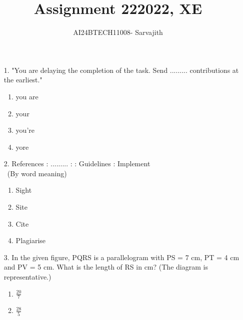 \documentclass[journal]{IEEEtran}
\begin{document}

\vspace{3cm}


\author{AI24BTECH11008- Sarvajith
}
\title{Assignment 22}
{\let\newpage\relax\maketitle}
\title{2022, XE}
\renewcommand{\thefigure}{\theenumi}
\renewcommand{\thetable}{\theenumi}
\setlength{\intextsep}{10pt} %
\renewcommand{\thetable}{\theenumi}
\begin{enumerate}
    \item[1.] "You are delaying the completion of the task. Send ......... contributions at the
    earliest."
    \begin{enumerate}[label = (\Alph*)]
        \item you are
        \item your
        \item you're 
        \item yore
    \end{enumerate}
    \item[2.] References : ......... : : Guidelines : Implement\\\
    (By word meaning)
    \begin{enumerate}[label = (\Alph*)]
        \item Sight
        \item Site
        \item Cite 
        \item Plagiarise 
    \end{enumerate}
    \item[3.] In the given figure, PQRS is a parallelogram with PS = 7 cm, PT = 4 cm and
    PV = 5 cm. What is the length of RS in cm? (The diagram is representative.) 
    \begin{figure}[!ht]
        \centering
        \caption{}
    \end{figure}
    \begin{enumerate}[label = (\Alph*)]
        \item $\frac{20}{7}$
        \item $\frac{28}{5}$

\end{enumerate}
\end{enumerate}
\end{document}
